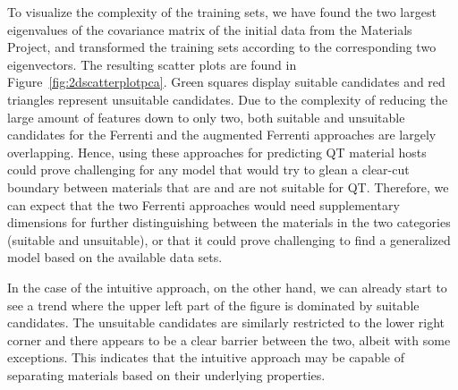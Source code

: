 \documentclass[superscriptaddress,unsortedaddress,
 amsmath,amssymb,
 aps,
]{revtex4-2}
\begin{document}
To visualize the complexity of the training sets, we have found the two largest eigenvalues of the covariance matrix of the initial data from the Materials Project, and transformed the training sets according to the corresponding two eigenvectors. The resulting scatter plots are found in Figure~\ref{fig:2dscatterplotpca}. 
Green squares display suitable candidates and red triangles represent unsuitable candidates. 
Due to the complexity of reducing the large amount of features down to only two, both suitable and unsuitable candidates for the Ferrenti and the augmented Ferrenti approaches are largely overlapping. 
Hence, using these approaches for predicting QT material hosts could prove challenging for any model that would try to glean a clear-cut boundary between materials that are and are not suitable for QT. 
Therefore, we can expect that the two Ferrenti approaches would need supplementary dimensions for further distinguishing between the materials in the two categories (suitable and unsuitable), or that it could prove challenging to find a generalized model based on the available data sets.  

In the case of the intuitive approach, on the other hand, we can already start to see a trend where the upper left part of the figure is dominated by suitable candidates. The unsuitable candidates are similarly restricted to the lower right corner and there appears to be a clear barrier between the two, albeit with some exceptions. This indicates that the intuitive approach may be capable of separating materials based on their underlying properties.  
\end{document}
